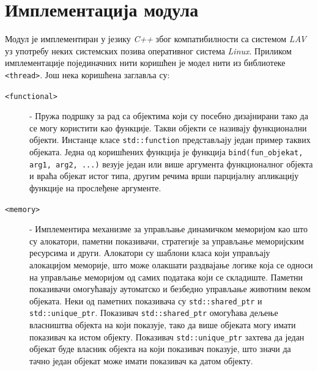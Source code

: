 \documentclass[12pt,oneside]{memoir}
\begin{document}
\section{Имплементација модула}
Модул је имплементиран у језику \textit{C++} због компатибилности са системом \textit{LAV} уз употребу неких системских позива оперативног система \textit{Linux}. Приликом имплементације појединачних нити коришћен је модел нити из библиотеке \texttt{<thread>}. Још нека коришћена заглавља су:

\begin{description}

\item[\texttt{<functional>}] - Пружа подршку за рад са објектима који су посебно дизајнирани тако да се могу користити као функције. Такви објекти се називају функционални објекти. Инстанце класе \texttt{std::function} представљају један пример таквих објеката. Једна од коришћених функција је функција \texttt{bind(fun\_objekat, arg1, arg2, ...)}  везује један или више аргумента функционалног објекта и враћа објекат истог типа, другим речима врши парцијалну апликацију функције на прослеђене аргументе.

\item[\texttt{<memory>}] - Имплементира механизме за управљање динамичком меморијом као што су алокатори, паметни показивачи, стратегије за управљање меморијским ресурсима и други. Алокатори су шаблони класа који управљају алокацијом меморије, што може олакшати раздвајање логике која се односи на управљање меморијом од самих података који се складиште. Паметни показивачи омогућавају аутоматско и безбедно управљање животним веком објеката. Неки од паметних показивача су \texttt{std::shared\_ptr} и \texttt{std::unique\_ptr}. Показивач \texttt{std::shared\_ptr} омогућава дељење власништва објекта на који показује, тако да више објеката могу имати показивач ка истом објекту. Показивач \texttt{std::unique\_ptr} захтева да један објекат буде власник објекта на који показивач показује, што значи да тачно један објекат може имати показивач ка датом објекту.   

\end{description}
\end{document}
